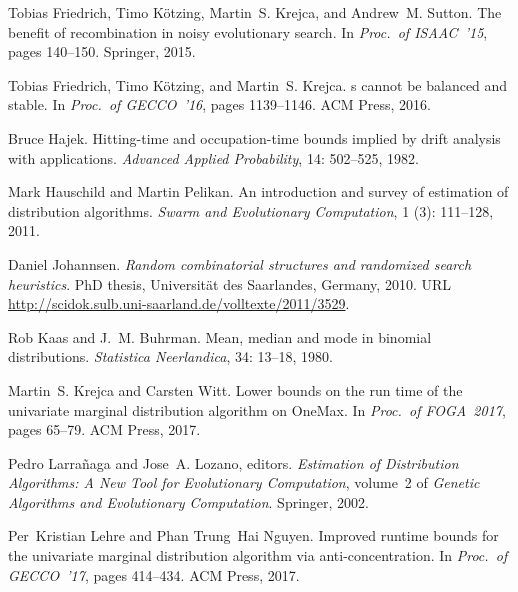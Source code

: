 \documentclass[11pt, a4paper]{article}
\begin{document}
\begin{thebibliography}{29}
Tobias Friedrich, Timo K{\"{o}}tzing, Martin~S. Krejca, and Andrew~M. Sutton.
\newblock The benefit of recombination in noisy evolutionary search.
\newblock In \emph{Proc.\ of ISAAC~'15}, pages 140--150. Springer, 2015.

Tobias Friedrich, Timo K{\"{o}}tzing, and Martin~S. Krejca.
s cannot be balanced and stable.
\newblock In \emph{Proc.\ of GECCO~'16}, pages 1139--1146. ACM Press, 2016.

Bruce Hajek.
\newblock Hitting-time and occupation-time bounds implied by drift analysis
  with applications.
\newblock \emph{Advanced Applied Probability}, 14: 502--525, 1982.

Mark Hauschild and Martin Pelikan.
\newblock An introduction and survey of estimation of distribution algorithms.
\newblock \emph{Swarm and Evolutionary Computation}, 1 (3):
  111--128, 2011.

Daniel Johannsen.
\newblock \emph{Random combinatorial structures and randomized search
  heuristics}.
\newblock PhD thesis, Universit{\"a}t des Saarlandes, Germany, 2010.
\newblock URL \url{http://scidok.sulb.uni-saarland.de/volltexte/2011/3529}.

Rob Kaas and J.~M. Buhrman.
\newblock Mean, median and mode in binomial distributions.
\newblock \emph{Statistica Neerlandica}, 34: 13--18, 1980.

Martin~S. Krejca and Carsten Witt.
\newblock Lower bounds on the run time of the univariate marginal distribution
  algorithm on {OneMax}.
\newblock In \emph{Proc.\ of FOGA~2017}, pages 65--79. ACM Press, 2017.

Pedro Larra{\~n}aga and Jose~A. Lozano, editors.
\newblock \emph{Estimation of Distribution Algorithms: A New Tool for
  Evolutionary Computation}, volume~2 of \emph{Genetic Algorithms and
  Evolutionary Computation}.
\newblock Springer, 2002.

Per~Kristian Lehre and Phan Trung~Hai Nguyen.
\newblock Improved runtime bounds for the univariate marginal distribution
  algorithm via anti-concentration.
\newblock In \emph{Proc.\ of GECCO~'17}, pages 414--434. ACM Press, 2017.


\end{thebibliography}
\end{document}
